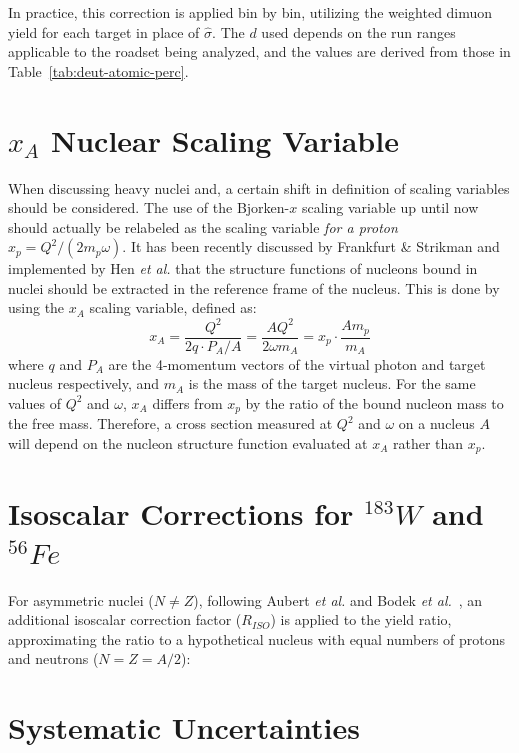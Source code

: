 In practice, this correction is applied bin by bin, utilizing the weighted dimuon yield for each target in place of $\hat{\sigma}$. The $d$ used depends on the run ranges applicable to the roadset being analyzed, and the values are derived from those in Table~\ref{tab:deut-atomic-perc}.

\section{\texorpdfstring{$x_A$ Nuclear Scaling Variable}{xA Nuclear Scaling Variable}}

When discussing heavy nuclei and, a certain shift in definition of scaling variables should be considered. The use of the Bjorken-$x$ scaling variable up until now should actually be relabeled as the scaling variable \emph{for a proton} $x_p = Q^2/(2 m_p \omega)$. It has been recently discussed by Frankfurt \& Strikman\cite{Frankfurt:2012qs} and implemented by Hen \emph{et al.}\cite{Hen:2013oha} that the structure functions of nucleons bound in nuclei should be extracted in the reference frame of the nucleus. This is done by using the $x_A$ scaling variable, defined as:
\begin{equation}
x_A = \frac{Q^2}{2q\cdot P_A/A} = \frac{AQ^2}{2\omega m_A} = x_p \cdot \frac{A m_p}{m_A}
\end{equation}
where $q$ and $P_A$ are the 4-momentum vectors of the virtual photon and target nucleus respectively, and $m_A$ is the mass of the target nucleus. For the same values of $Q^2$ and $\omega$, $x_A$ differs from $x_p$ by the ratio of the bound nucleon mass to the free mass. Therefore, a cross section measured at $Q^2$ and $\omega$ on a nucleus $A$ will depend on the nucleon structure function evaluated at $x_A$ rather than $x_p$.

\section{\texorpdfstring{Isoscalar Corrections for $^{183}W$ and $^{56}Fe$}{Isoscalar Corrections for W-183 and Fe-56 }}


For asymmetric nuclei ($N\neq Z$), following Aubert \emph{et al.} and Bodek \emph{et al.}~\cite{Aubert:1983xm, PhysRevLett.50.1431}, an additional isoscalar correction factor ($R_{ISO}$) is applied to the yield ratio, approximating the ratio to a hypothetical nucleus with equal numbers of protons and neutrons ($N=Z=A/2$):

\section{Systematic Uncertainties}
